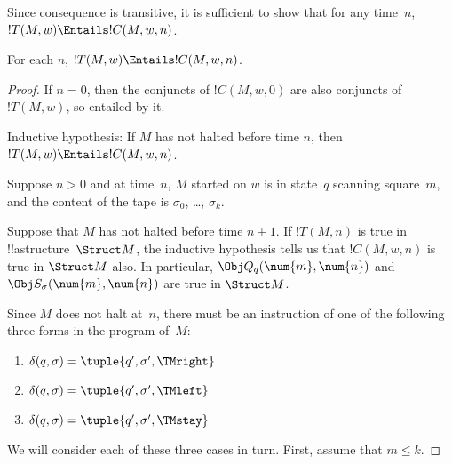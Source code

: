 \documentclass[../../../include/open-logic-section]{subfiles}
\begin{document}
Since consequence is transitive, it is sufficient to show that for any
time~$n$, $!T(M, w) \Entails !C(M, w, n)$.

\begin{lem}
For each $n$, $!T(M, w) \Entails !C(M, w, n)$. 
\end{lem}

\begin{proof}
If $n = 0$, then the conjuncts of $!C(M, w, 0)$ are also conjuncts of
$!T(M, w)$, so entailed by it.

Inductive hypothesis: If $M$ has not halted before time $n$, then
$!T(M,w) \Entails !C(M, w, n)$.

Suppose $n > 0$ and at time~$n$, $M$ started on $w$ is in state~$q$
scanning square~$m$, and the content of the tape is $\sigma_0$, \dots,
$\sigma_k$.

Suppose that $M$ has not halted before time $n+1$. If $!T(M,n)$ is
true in !!a{structure}~$\Struct M$, the inductive hypothesis tells us
that $!C(M, w, n)$ is true in $\Struct M$ also. In particular, $\Obj
Q_q(\num{m}, \num{n})$ and $\Obj S_\sigma(\num{m}, \num{n})$ are true
in $\Struct M$.

Since $M$ does not halt at~$n$, there must be an instruction of one of the
following three forms in the program of~$M$: 

\begin{enumerate} 
\item {} $\delta(q, \sigma) = \tuple{q', \sigma', \TMright}$

\item {} $\delta(q, \sigma) = \tuple{q', \sigma', \TMleft}$

\item {} $\delta(q, \sigma) = \tuple{q', \sigma', \TMstay}$
\end{enumerate}

We will consider each of these three cases in turn.  First, assume
that $m \le k$.


\end{proof}
\end{document}
